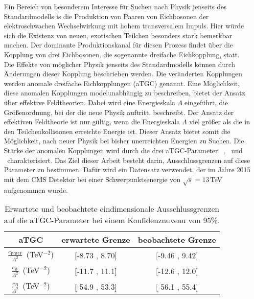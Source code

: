 Ein Bereich von besonderem Interesse für Suchen nach Physik jenseits des Standardmodells is die Produktion von Paaren von Eichbosonen der elektroschwachen Wechselwirkung mit hohem transversalem Impuls. Hier würde sich die Existenz von neuen, exotischen Teilchen besonders stark bemerkbar machen. Der dominante Produktionskanal für diesen Prozess findet über die Kopplung von drei Eichbosonen, die sogenannte dreifache Eichkopplung, statt. Die Effekte von möglicher Physik jenseits des Standardmodells können durch Änderungen dieser Kopplung beschrieben werden. Die veränderten Kopplungen werden anomale dreifache Eichkopplungen (aTGC) genannt. Eine Möglichkeit, diese anomalen Kopplungen modelunabhängig zu beschreiben, bietet der Ansatz über effektive Feldtheorien. Dabei wird eine Energieskala $\Lambda$ eingeführt, die Größenordnung, bei der die neue Physik auftritt, beschreibt. Der Ansatz der effektiven Feldtheorie ist nur gültig, wenn die Energieskala $\Lambda$ viel größer als die in den Teilchenkollisionen erreichte Energie ist. Dieser Ansatz bietet somit die Möglichkeit, nach neuer Physik bei bisher unerreichten Energien zu Suchen. Die Stärke der anomalen Kopplungen wird durch die drei aTGC-Parameter \Tcwww \ , \Tccw \ und \Tcb \ charakterisiert. Das Ziel dieser Arbeit besteht darin, Ausschlussgrenzen auf diese Parameter zu bestimmen. Dafür wird ein Datensatz verwendet, der im Jahre 2015 mit dem CMS Detektor bei einer Schwerpunktsenergie von $\sqrt{s}=13$\,TeV aufgenommen wurde.\\

\begin{table}
	\centering
	\caption[Erwartete und beobachtete Ausschlussgrenzen bei einem Konfidenznuveau von 95\%]{Erwartete und beobachtete eindimensionale Ausschlussgrenzen auf die aTGC-Parameter bei einem Konfidenznuveau von 95\%.}
	\label{tab:intro_ger:1d}
	\begin{tabular}{ccc}
	\hline
	aTGC              &     erwartete Grenze & beobachtete Grenze\\
	\hline
	$\frac{c_{WWW}}{\Lambda ^2}$~(TeV$^{-2}$) &  [-8.73 , 8.70] &  [-9.46 , 9.42] \\
	$\frac{c_{W}}{\Lambda ^2}$~(TeV$^{-2}$)   &  [-11.7 , 11.1] &  [-12.6 , 12.0] \\
	$\frac{c_{B}}{\Lambda ^2}$~(TeV$^{-2}$)   & [-54.9 , 53.3] &  [-56.1 , 55.4] \\
	\hline
	\end{tabular}
\end{table}

